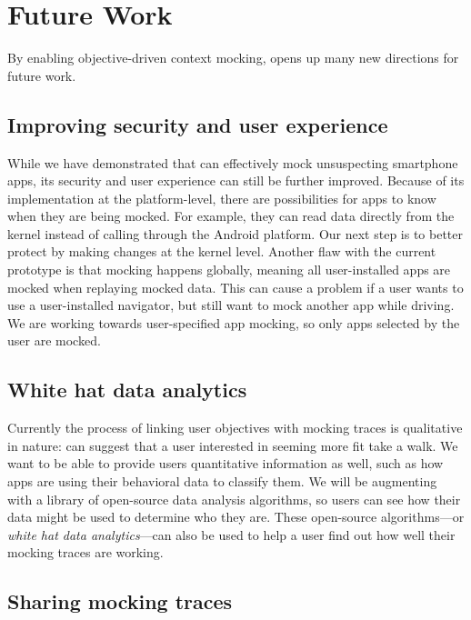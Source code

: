 \section{Future Work}
\label{sec-future}

By enabling objective-driven context mocking, \PocketMocker{} opens up many
new directions for future work.

\subsection{Improving security and user experience}

While we have demonstrated that \PocketMocker{} can effectively mock
unsuspecting smartphone apps, its security and user experience can still be
further improved. Because of its implementation at the platform-level, there
are possibilities for apps to know when they are being mocked. For example,
they can read data directly from the kernel instead of calling through the
Android platform. Our next step is to better protect \PocketMocker{} by making
changes at the kernel level. Another flaw with the current prototype is that
mocking happens globally, meaning all user-installed apps are mocked when
replaying mocked data. This can cause a problem if a user wants to use a
user-installed navigator, but still want to mock another app while driving. We
are working towards user-specified app mocking, so only apps selected by the
user are mocked.

\subsection{White hat data analytics}

Currently the process of linking user objectives with mocking traces is
qualitative in nature: \PocketMocker{} can suggest that a user interested in
seeming more fit take a walk. We want to be able to provide users quantitative
information as well, such as how apps are using their behavioral data to
classify them. We will be augmenting \PocketMocker{} with a library of
open-source data analysis algorithms, so users can see how their data might be
used to determine who they are. These open-source algorithms---or \textit{white
hat data analytics}---can also be used to help a user find out how well their
mocking traces are working.

\subsection{Sharing mocking traces}

